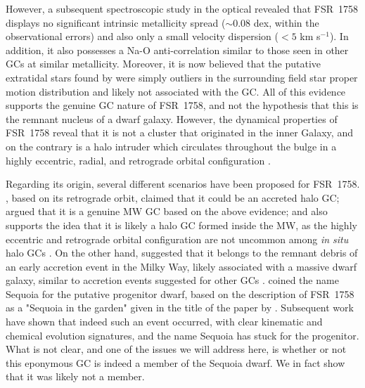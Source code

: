 \documentclass[longauth]{aa} %
\begin{document}
However, a subsequent spectroscopic study in the optical  \citep{Villanova2019} revealed that FSR~1758 displays no significant intrinsic metallicity spread ($\sim$0.08 dex, within the observational errors) and also only a small velocity dispersion ($<5$ km s$^{-1}$). In addition, it also possesses a  Na-O anti-correlation similar to those seen in other GCs at similar metallicity. Moreover, it is now believed that the putative extratidal stars found by \citet{Barba2019} were simply outliers in the surrounding field star proper motion distribution and likely not associated with the GC. All of this evidence supports the genuine GC nature of FSR~1758, and not the hypothesis that this is the remnant nucleus of a dwarf galaxy.  However, the dynamical properties of FSR~1758 reveal that it is not a cluster that originated in the inner Galaxy, and on the contrary  is  a halo intruder which circulates throughout the bulge in a highly eccentric, radial, and retrograde orbital configuration \citep[see, e.g.,][]{Simpson2019, Villanova2019, Yeh2020}. 

Regarding its origin, several different scenarios have been proposed for FSR~1758. \citet{Simpson2019}, based on its retrograde orbit, claimed that it could be an accreted halo GC; \citet{Villanova2019} argued that it is a genuine MW GC based on the above evidence; and \citet{Yeh2020} also supports the idea that it is likely a halo GC formed inside the MW, as the highly eccentric and retrograde orbital configuration are not uncommon among \textit{in situ} halo GCs \citep[][]{Massari2019}. On the other hand, \citet{Myeong2019} suggested that it belongs to the remnant debris of an early accretion event in the Milky Way, likely associated with a massive dwarf galaxy, similar to accretion events suggested for other GCs \citep[see, e.g.,][]{Myeong2019, Kruijssen2019}. \citet{Myeong2019} coined the name Sequoia for the putative progenitor dwarf, based on the description of FSR~1758 as a "Sequoia in the garden" given in the title of the paper by \citet{Barba2019}. Subsequent work \citep{Massari2019, Koppelman2019, FT_Subpopulation, FT_Jurassic} have shown that indeed such an event occurred, with clear kinematic and chemical evolution signatures, and the name Sequoia has stuck for the progenitor. What is not clear, and one of the issues we will address here, is whether or not this eponymous GC is indeed a member of the Sequoia dwarf. We in fact show that it was likely not a member.
\end{document}
